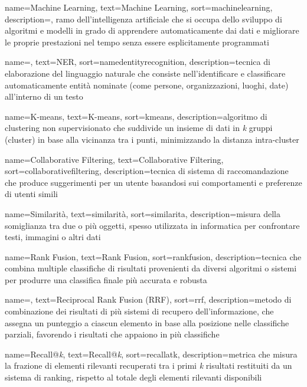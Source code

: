 {
    name=Machine Learning,
    text=Machine Learning,
    sort=machinelearning,
    description={, ramo dell'intelligenza artificiale che si occupa dello sviluppo di algoritmi e modelli in grado di apprendere automaticamente dai dati e migliorare le proprie prestazioni nel tempo senza essere esplicitamente programmati}
}

 {
    name=,
    text=NER,
    sort=namedentityrecognition,
    description={tecnica di elaborazione del linguaggio naturale che consiste nell'identificare e classificare automaticamente entità nominate (come persone, organizzazioni, luoghi, date) all'interno di un testo}
}

 {
    name=K-means,
    text=K-means,
    sort=kmeans,
    description={algoritmo di clustering non supervisionato che suddivide un insieme di dati in \emph{k} gruppi (cluster) in base alla vicinanza tra i punti, minimizzando la distanza intra-cluster}
}

 {
    name=Collaborative Filtering,
    text=Collaborative Filtering,
    sort=collaborativefiltering,
    description={tecnica di sistema di raccomandazione che produce suggerimenti per un utente basandosi sui comportamenti e preferenze di utenti simili}
}

 {
    name=Similarità,
    text=similarità,
    sort=similarita,
    description={misura della somiglianza tra due o più oggetti, spesso utilizzata in informatica per confrontare testi, immagini o altri dati}
}

 {
    name=Rank Fusion,
    text=Rank Fusion,
    sort=rankfusion,
    description={tecnica che combina multiple classifiche di risultati provenienti da diversi algoritmi o sistemi per produrre una classifica finale più accurata e robusta}
}

 {
    name=,
    text=Reciprocal Rank Fusion (RRF),
    sort=rrf,
    description={metodo di combinazione dei risultati di più sistemi di recupero dell'informazione, che assegna un punteggio a ciascun elemento in base alla posizione nelle classifiche parziali, favorendo i risultati che appaiono in più classifiche}
}

 {
    name=Recall@\emph{k},
    text=Recall@\emph{k},
    sort=recallatk,
    description={metrica che misura la frazione di elementi rilevanti recuperati tra i primi \emph{k} risultati restituiti da un sistema di ranking, rispetto al totale degli elementi rilevanti disponibili}
}

